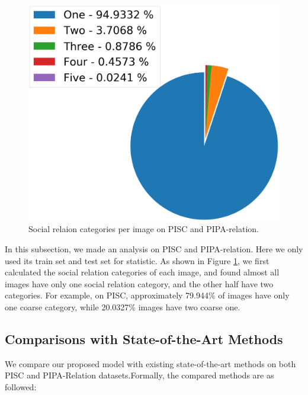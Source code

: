 \documentclass{article}
\begin{document}
\begin{figure}[t]
{    \begin{minipage}[t]{0.45\linewidth}
      \centering
      \includegraphics[width=1\linewidth]{pic/PIPA_fine.png}
    \end{minipage}
  }
  \caption{Social relaion categories per image on PISC and PIPA-relation.}
  \label{fig:dataset_analysis}
\end{figure}

In this subsection, we made an analysis on PISC and PIPA-relation. Here we only used its train set and test set for statistic. As shown in Figure \ref{fig:dataset_analysis}, we first calculated the social relation categories of each image, and found almost all images have only one social relation category, and the other half have two categories. For example, on PISC, approximately 79.944\% of images have only one coarse category, while 20.0327\% images have two coarse one.

\subsection{Comparisons with State-of-the-Art Methods}

We compare our proposed model with existing state-of-the-art methods on both PISC and PIPA-Relation datasets.Formally, the compared methods are as followed:
\end{document}
